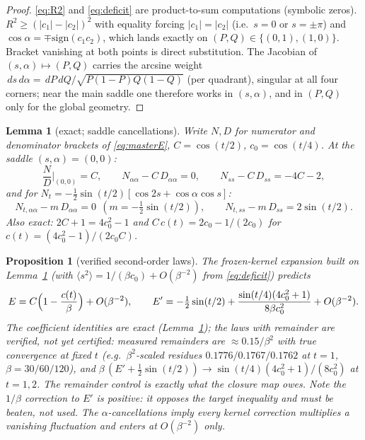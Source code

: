 \documentclass[11pt]{article}
\newtheorem{lemma}[theorem]{Lemma}
\newtheorem{proposition}[theorem]{Proposition}
\theoremstyle{remark}
\newcommand{\dd}{\,d}
\begin{document}
\begin{proof}
\eqref{eq:R2} and \eqref{eq:deficit} are product-to-sum computations
(symbolic zeros). $R^2\ge(|c_1|-|c_2|)^2$ with equality forcing
$|c_1|=|c_2|$ (i.e.\ $s=0$ or $s=\pm\pi$) and $\cos\alpha=\mp
\mathrm{sign}(c_1c_2)$, which lands exactly on $(P,Q)\in\{(0,1),(1,0)\}$.
Bracket vanishing at both points is direct substitution. The Jacobian of
$(s,\alpha)\mapsto(P,Q)$ carries the arcsine weight
$\dd s\dd\alpha=\dd P\dd Q/\sqrt{P(1-P)Q(1-Q)}$ (per quadrant), singular
at all four corners; near the main saddle one therefore works in
$(s,\alpha)$, and in $(P,Q)$ only for the global geometry.
\end{proof}

\begin{lemma}[exact; saddle cancellations]
\label{lem:cancel}
Write $N,D$ for numerator and denominator brackets of \eqref{eq:masterE},
$C=\cos(t/2)$, $c_0=\cos(t/4)$. At the saddle $(s,\alpha)=(0,0)$:
\[
\frac{N}{D}\Big|_{(0,0)}=C,\qquad
N_{\alpha\alpha}-C\,D_{\alpha\alpha}=0,\qquad
N_{ss}-C\,D_{ss}=-4C-2,
\]
and for $N_t=-\tfrac12\sin(t/2)[\cos2s+\cos\alpha\cos s]$:
\[
N_{t,\alpha\alpha}-m\,D_{\alpha\alpha}=0\ \ (m=-\tfrac12\sin(t/2)),
\qquad N_{t,ss}-m\,D_{ss}=2\sin(t/2).
\]
Also exact: $2C+1=4c_0^2-1$ and $C\,c(t)=2c_0-1/(2c_0)$ for
$c(t)=(4c_0^2-1)/(2c_0C)$.
\end{lemma}

\begin{proposition}[verified second-order laws]\label{prop:secondorder}
The frozen-kernel expansion built on Lemma~\ref{lem:cancel} (with
$\langle s^2\rangle=1/(\beta c_0)+O(\beta^{-2})$ from
\eqref{eq:deficit}) predicts
\begin{equation}\label{eq:secondorder}
E=C\Bigl(1-\frac{c(t)}{\beta}\Bigr)+O(\beta^{-2}),\qquad
E'=-\tfrac12\sin(t/2)+\frac{\sin(t/4)(4c_0^2+1)}{8\beta c_0^2}
+O(\beta^{-2}).
\end{equation}
The coefficient identities are exact (Lemma~\ref{lem:cancel}); the
\emph{laws with remainder} are verified, not yet certified: measured
remainders are $\approx0.15/\beta^2$ with true convergence at fixed $t$
(e.g.\ $\beta^2$-scaled residues $0.1776/0.1767/0.1762$ at $t=1$,
$\beta=30/60/120$), and $\beta\,(E'+\tfrac12\sin(t/2))\to
\sin(t/4)(4c_0^2+1)/(8c_0^2)$ at $t=1,2$. The remainder control is
exactly what the closure map owes. Note the $1/\beta$ correction to $E'$
is \emph{positive}: it opposes the target inequality and must be beaten,
not used. The $\alpha$-cancellations imply every kernel correction
multiplies a vanishing fluctuation and enters at $O(\beta^{-2})$ only.
\end{proposition}
\end{document}
